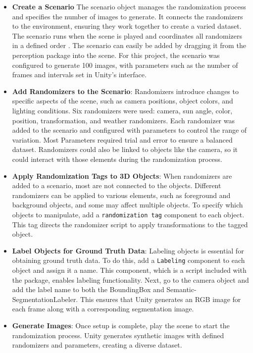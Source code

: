 \begin{itemize} \item \textbf{Create a Scenario}
The scenario object manages the randomization process and specifies the number of images to generate. It connects the randomizers to the environment, ensuring they work together to create a varied dataset. The scenario runs when the scene is played and coordinates all randomizers in a defined order \cite{borkman2021unityperceptiongeneratesynthetic}. The scenario can easily be added by dragging it from the perception package into the scene. For this project, the scenario was configured to generate 100 images, with parameters such as the number of frames and intervals set in Unity’s interface.

\item \textbf{Add Randomizers to the Scenario}: Randomizers introduce changes to specific aspects of the scene, such as camera positions, object colors, and lighting conditions. Six randomizers were used: camera, sun angle, color, position, transformation, and weather randomizers. Each randomizer was added to the scenario and configured with parameters to control the range of variation. Most Parameters required trial and error to ensure a balanced dataset. Randomizers could also be linked to objects like the camera, so it could interact with those elements during the randomization process.

\item \textbf{Apply Randomization Tags to 3D Objects}: When randomizers are added to a scenario, most are not connected to the objects. Different randomizers can be applied to various elements, such as foreground and background objects, and some may affect multiple objects. To specify which objects to manipulate, add a \texttt{randomization tag} component to each object. This tag directs the randomizer script to apply transformations to the tagged object.

\item \textbf{Label Objects for Ground Truth Data}: Labeling objects is essential for obtaining ground truth data. To do this, add a \texttt{Labeling} component to each object and assign it a name. This component, which is a script included with the package, enables labeling functionality. Next, go to the camera object and add the label name to both the BoundingBox and Semantic- SegmentationLabeler. This ensures that Unity generates an RGB image for each frame along with a corresponding segmentation image.

\item \textbf{Generate Images}: Once setup is complete, play the scene to start the randomization process. Unity generates synthetic images with defined randomizers and parameters, creating a diverse dataset.
\end{itemize}



